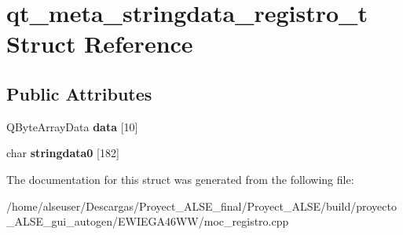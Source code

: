 \hypertarget{structqt__meta__stringdata__registro__t}{}\section{qt\+\_\+meta\+\_\+stringdata\+\_\+registro\+\_\+t Struct Reference}
\label{structqt__meta__stringdata__registro__t}
\subsection*{Public Attributes}
\begin{DoxyCompactItemize}
\item 
\mbox{\label{structqt__meta__stringdata__registro__t_aabfb527b208296c0a72b076bb0d223ed}} 
Q\+Byte\+Array\+Data {\bfseries data} \mbox{[}10\mbox{]}
\item 
\mbox{\label{structqt__meta__stringdata__registro__t_a07e00c83aed576505de5b2b4294a8cea}} 
char {\bfseries stringdata0} \mbox{[}182\mbox{]}
\end{DoxyCompactItemize}


The documentation for this struct was generated from the following file\+:\begin{DoxyCompactItemize}
\item 
/home/alseuser/\+Descargas/\+Proyect\+\_\+\+A\+L\+S\+E\+\_\+final/\+Proyect\+\_\+\+A\+L\+S\+E/build/proyecto\+\_\+\+A\+L\+S\+E\+\_\+gui\+\_\+autogen/\+E\+W\+I\+E\+G\+A46\+W\+W/moc\+\_\+registro.\+cpp\end{DoxyCompactItemize}
